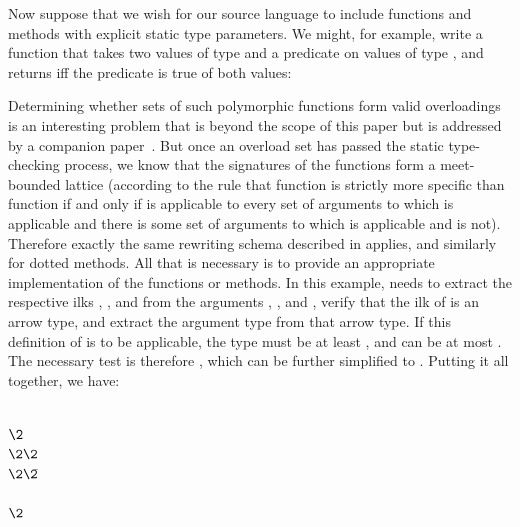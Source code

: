 Now suppose that we wish for our source language to include functions and methods
with explicit static type parameters.  We might, for example, write a function
 that takes two values of type  and a predicate on values of
type , and returns  iff the predicate is true of both values:
\begin{codeexamplesize}
\begin{tabbing}
\end{tabbing}
\end{codeexamplesize}
Determining whether sets of such polymorphic functions form valid overloadings
is an interesting problem that is beyond the scope
of this paper but is addressed by a companion paper~\cite{FORTRESS-TYPE-POPL-SUBMISSION}.  But once
an overload set has passed the static type-checking process, we know
that the signatures of the functions form a meet-bounded lattice
(according to the rule that function  is strictly more specific than function 
if and only if  is applicable to every set of arguments to which 
is applicable and there is some set of arguments to which  is applicable
and  is not).  Therefore exactly the same rewriting schema described
in  applies, and similarly for dotted methods.
All that is necessary is to provide an appropriate implementation of the 
functions or methods.
In this example,  needs to extract the respective ilks , , and 
from the arguments , , and , verify that the ilk of  is an arrow type,
and extract the argument type  from that arrow type.
If this definition of  is to be applicable, the type  must be at least , and can be at most .
The necessary test is therefore ,
which can be further simplified to .  Putting it all together, we have:
\begin{codeexamplesize}
\begin{tabbing}
 \\
\(\2\) \\
\(\2\2\) \\
\(\2\2\)\EXP{\bigl(}\!\= \\
\>       \\
\(\2\)
\end{tabbing}
\end{codeexamplesize}
